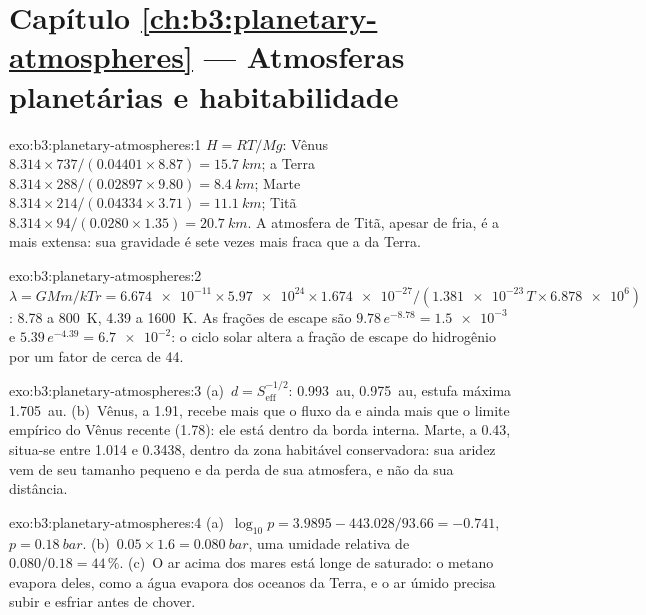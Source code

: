 \section*{Capítulo \ref{ch:b3:planetary-atmospheres} --- Atmosferas planetárias e habitabilidade}

\begin{solution}{exo:b3:planetary-atmospheres:1}
$H = RT/Mg$: Vênus $8.314\times737/(0.04401\times8.87) = \qty{15.7}{km}$;
a Terra $8.314\times288/(0.02897\times9.80) = \qty{8.4}{km}$; Marte
$8.314\times214/(0.04334\times3.71) = \qty{11.1}{km}$; Titã
$8.314\times94/(0.0280\times1.35) = \qty{20.7}{km}$. A atmosfera de Titã,
apesar de fria, é a mais extensa: sua gravidade é sete vezes mais fraca
que a da Terra.
\end{solution}

\begin{solution}{exo:b3:planetary-atmospheres:2}
$\lambda = GMm/kTr = \num{6.674e-11}\times\num{5.97e24}\times\num{1.674e-27}
/(\num{1.381e-23}\,T\times\num{6.878e6})$: 8.78 a \qty{800}{K}, 4.39 a
\qty{1600}{K}. As frações de escape são $9.78\,e^{-8.78} =
\num{1.5e-3}$ e $5.39\,e^{-4.39} = \num{6.7e-2}$: o ciclo solar
altera a fração de escape do hidrogênio por um fator de cerca de 44.
\end{solution}

\begin{solution}{exo:b3:planetary-atmospheres:3}
(a)~$d = S_\mathrm{eff}^{-1/2}$:  \qty{0.993}{au}, 
\qty{0.975}{au}, estufa máxima \qty{1.705}{au}. (b)~Vênus, a 1.91,
recebe mais que o fluxo da  e ainda mais que o limite empírico
do Vênus recente (1.78): ele está dentro da borda interna. Marte, a 0.43,
situa-se entre 1.014 e 0.3438, dentro da zona habitável conservadora:
sua aridez vem de seu tamanho pequeno e da perda de sua atmosfera, e não
da sua distância.
\end{solution}

\begin{solution}{exo:b3:planetary-atmospheres:4}
(a)~$\log_{10}p = 3.9895 - 443.028/93.66 = -0.741$, $p =
\qty{0.18}{bar}$. (b)~$0.05\times1.6 = \qty{0.080}{bar}$, uma umidade relativa
de $0.080/0.18 = 44\,\%$. (c)~O ar acima dos mares está longe de
saturado: o metano evapora deles, como a água evapora dos
oceanos da Terra, e o ar úmido precisa subir e esfriar antes de chover.
\end{solution}


